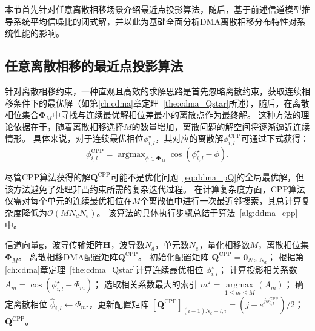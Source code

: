 本节首先针对任意离散相移场景介绍最近点投影算法，随后，基于前述信道模型推导系统平均信噪比的闭式解，并以此为基础全面分析DMA离散相移分布特性对系统性能的影响。

\subsection{任意离散相移的最近点投影算法}

针对离散相移约束，一种直观且高效的求解思路是首先忽略离散约束，获取连续相移条件下的最优解（如第\ref{ch:cdma}章定理~\ref{the:cdma_Qstar}所述），随后，在离散相位集合$\bm \Phi_M$中寻找与连续最优解相位差最小的离散点作为最终解。
这种方法的理论依据在于，随着离散相移选择$M$的数量增加，离散问题的解空间将逐渐逼近连续情形\cite{you2020channel, wang2021dynamic, abeywickrama2020intelligent}。
具体来说，对于连续最优相位$\phi_{i,l}^\star$，其对应的离散解$\phi_{i,l}^{\text{CPP}}$可通过下式获得：
\begin{equation}
	\phi_{i,l}^{\text{CPP}} = \mathop{\arg\max}_{\phi \in \bm \Phi_M} \cos(\phi_{i,l}^\star-\phi).
\end{equation}

尽管CPP算法获得的解$\bm Q^{\text{CPP}}$可能不是优化问题~\eqref{eq:ddma_pQ}的全局最优解，但该方法避免了处理非凸约束所需的复杂迭代过程。
在计算复杂度方面，CPP算法仅需对每个单元的连续最优相位在$M$个离散值中进行一次最近邻搜索，其总计算复杂度降低为$\mathcal{O}(MN_dN_e)$。
该算法的具体执行步骤总结于算法~\ref{alg:ddma_cpp}中。

\begin{algorithm}[!t]
	\caption{离散相移最近点投影算法（CPP）}
	\label{alg:ddma_cpp}
	\begin{algorithmic}[1]
		\REQUIRE 信道向量$\bm g$，波导传输矩阵$\bm H$，波导数$N_d$，单元数$N_e$，量化相移数$M$，离散相位集$\bm \Phi_M$。
		\ENSURE 离散相移DMA配置矩阵$\bm Q^{\text{CPP}}$。
		\STATE 初始化配置矩阵 $\bm Q^{\text{CPP}}=\bm 0_{N\times N_d}$；
		\STATE 根据第\ref{ch:cdma}章定理~\ref{the:cdma_Qstar}计算连续最优相位 $\phi_{i,l}^\star$；
		\STATE 计算投影相关系数 $A_m=\cos(\phi_{i,l}^\star-\Phi_m)$；
		\ENDFOR
		\STATE 选取相关系数最大的索引 $m^\star=\mathop{\arg\max}\limits_{1\leq m \leq M} (A_m)$；
		\STATE 确定离散相位 $\hat{\phi}_{i,l}\leftarrow\Phi_{m^\star}$，更新配置矩阵 $[\bm Q^{\text{CPP}}]_{(i-1)N_e+l, i} = (j+e^{j \phi_{i,l}^{\text{CPP}}})/2$；
		\ENDFOR
		\ENDFOR
		\RETURN $\bm Q^{\text{CPP}}$。
	\end{algorithmic}
\end{algorithm}

